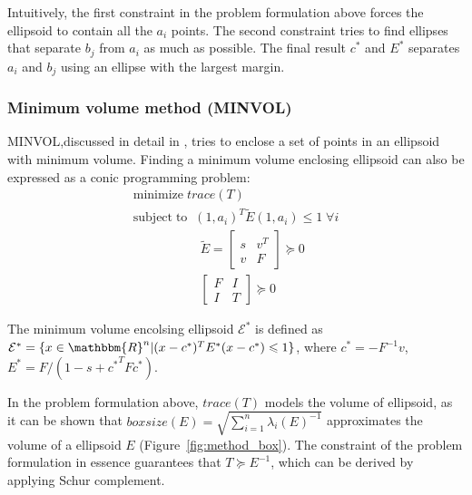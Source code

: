 \documentclass{scrartcl}
\begin{document}
\par
Intuitively, the first constraint in the problem formulation above forces the
ellipsoid to contain all the $a_i$ points.
The second constraint tries to find ellipses that separate $b_j$ from $a_i$
as much as possible.
The final result $c^{*}$ and $E^{*}$ separates $a_i$ and $b_j$ using an ellipse
with the largest margin.

\subsubsection{Minimum volume method (MINVOL)}

\par
MINVOL,discussed in detail in \cite{glineur1998},  tries to enclose a set of
points in an ellipsoid with minimum volume.
Finding a minimum volume enclosing ellipsoid can also be expressed as a conic
programming problem:
\begin{gather*}
    \mathrm{minimize}\;trace(T) \\
    \mathrm{subject\;to}\;\;
    (1,a_i)^T\tilde{E}(1,a_i)\leqslant1 \; \forall i \\
    \;\;\;\;\;\;\;\;\;\;\;\;\;\;\;\;\;\;\;
    \tilde{E}=
    \left[
        \begin{array}{cc}
            s & v^T \\
            v & F
        \end{array}
    \right] \succeq 0 \\
    \;\;\;\;\;\;\;\;\;\;\;\;\;\;\;\;\;\;\;
    \left[
        \begin{array}{cc}
            F & I \\
            I & T
        \end{array}
    \right] \succeq 0
\end{gather*}

\par
The minimum volume encolsing ellipsoid $\mathcal{E}^{*}$ is defined as
$\mathcal{E}^{*}=
\{x \in \mathbbm{R}^{n} | (x-c^{*})^TE^{*}(x-c^{*})\leqslant1\}$,
where
$c^{*}=-F^{-1}v$, $E^{*}=F/(1-s+{c^{*}}^TF{c^{*}})$.

\par
In the problem formulation above, $trace(T)$ models the volume of ellipsoid,
as it can be shown that
$boxsize(E)=\sqrt{\sum_{i=1}^n \lambda_{i}(E)^{-1}}$ approximates the volume
of a ellipsoid $E$ (Figure~\ref{fig:method_box}).
The constraint of the problem formulation in essence guarantees that
$T \succeq E^{-1}$, which can be derived by applying Schur complement.
\end{document}

